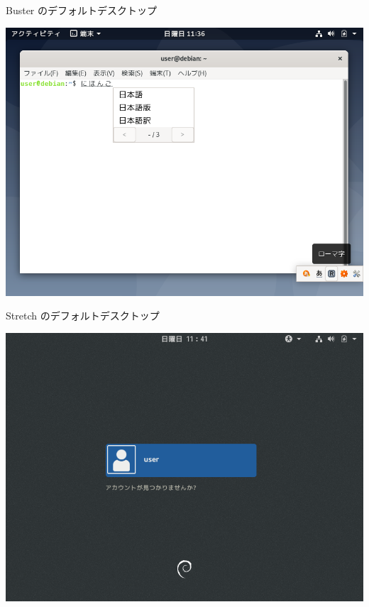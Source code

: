 \begin{frame}{Buster のデフォルトデスクトップ}

\begin{center}
\includegraphics[keepaspectratio,width=1\hsize]{image201907/buster_gnome_3.png}
\end{center}

\end{frame}

\begin{frame}{Stretch のデフォルトデスクトップ}

\begin{center}
\includegraphics[keepaspectratio,width=1\hsize]{image201907/stretch_gdm3.png}
\end{center}

\end{frame}

